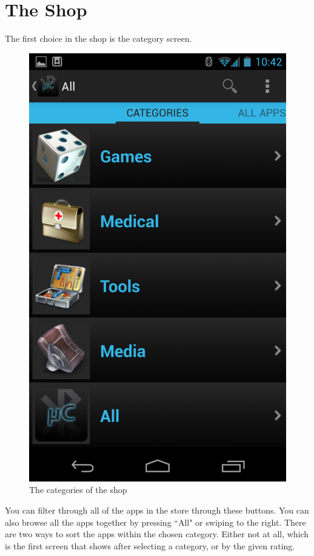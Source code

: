 	\section{The Shop}
		The first choice in the shop is the category screen.\\
		\newline
		\begin{figure}[H]
			\centering
			\includegraphics[scale = 0.3]{images/Screenshots/category_view.png}
			\caption{The categories of the shop}
		\end{figure}
		You can filter through all of the apps in the store through these buttons. You can also browse all the apps together by pressing ``All" or swiping to the right. There are two ways to sort the apps within the chosen category. Either not at all, which is the first screen that shows after selecting a category, or by the given rating. \\
